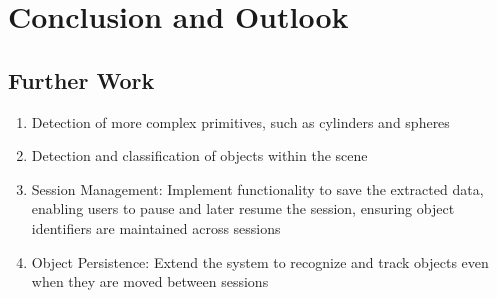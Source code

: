 \chapter{Conclusion and Outlook}

\section{Further Work}
\begin{enumerate}
    \item Detection of more complex primitives, such as cylinders and spheres
    \item Detection and classification of objects within the scene
    \item Session Management: Implement functionality to save the extracted data, enabling users to pause and later resume the session, ensuring object identifiers are maintained across sessions
    \item Object Persistence: Extend the system to recognize and track objects even when they are moved between sessions
\end{enumerate}


